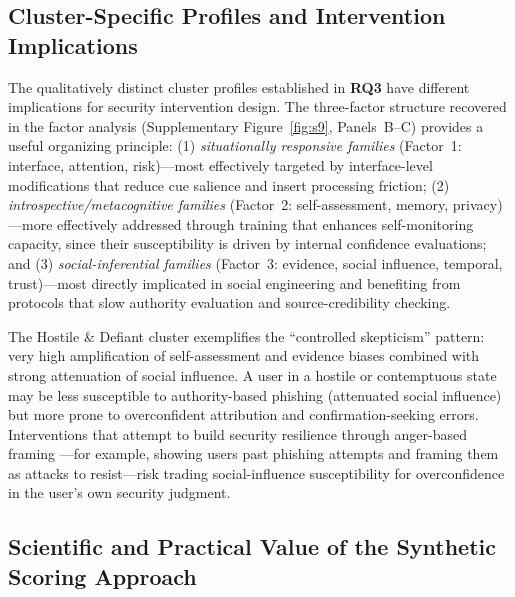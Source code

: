 \documentclass[12pt,a4paper]{article}
\begin{document}
\subsection{Cluster-Specific Profiles and Intervention Implications}

\label{sec:discussion-factor}

The qualitatively distinct cluster profiles established in \textbf{RQ3} have different implications for security intervention design. The three-factor structure recovered in the factor analysis (Supplementary Figure~\ref{fig:s9}, Panels~B--C) provides a useful organizing principle: (1) \textit{situationally responsive families} (Factor~1: interface, attention, risk)---most effectively targeted by interface-level modifications that reduce cue salience and insert processing friction; (2) \textit{introspective/metacognitive families} (Factor~2: self-assessment, memory, privacy)---more effectively addressed through training that enhances self-monitoring capacity, since their susceptibility is driven by internal confidence evaluations; and (3) \textit{social-inferential families} (Factor~3: evidence, social influence, temporal, trust)---most directly implicated in social engineering and benefiting from protocols that slow authority evaluation and source-credibility checking.

The Hostile \& Defiant cluster exemplifies the ``controlled skepticism'' pattern: very high amplification of self-assessment and evidence biases combined with strong attenuation of social influence. A user in a hostile or contemptuous state may be less susceptible to authority-based phishing (attenuated social influence) but more prone to overconfident attribution and confirmation-seeking errors. Interventions that attempt to build security resilience through anger-based framing \citep{lerner2000beyond}---for example, showing users past phishing attempts and framing them as attacks to resist---risk trading social-influence susceptibility for overconfidence in the user's own security judgment.

\subsection{Scientific and Practical Value of the Synthetic Scoring Approach}
\end{document}
